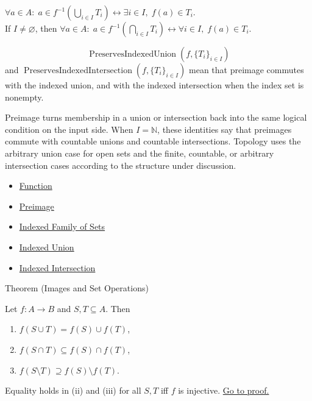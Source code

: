 \begin{remark*}
$\forall a\in A:\; a\in f^{-1}(\bigcup_{i\in I}T_i)
\leftrightarrow \exists i\in I,\; f(a)\in T_i$.\\
If $I\neq\varnothing$, then
$\forall a\in A:\; a\in f^{-1}(\bigcap_{i\in I}T_i)
\leftrightarrow \forall i\in I,\; f(a)\in T_i$.
\end{remark*}

\begin{remark*}
\[
  \operatorname{PreservesIndexedUnion}(f,\{T_i\}_{i\in I})
\] and
$\operatorname{PreservesIndexedIntersection}(f,\{T_i\}_{i\in I})$ mean
that preimage commutes with the indexed union, and with the indexed intersection
when the index set is nonempty.
\end{remark*}

\begin{remark*}[Interpretation]
Preimage turns membership in a union or intersection back into the same
logical condition on the input side. When $I=\mathbb{N}$, these identities say
that preimages commute with countable unions and countable intersections.
Topology uses the arbitrary union case for open sets and the finite, countable,
or arbitrary intersection cases according to the structure under discussion.
\end{remark*}

\begin{dependencies}
\begin{itemize}
  \item \hyperref[def:function]{Function}
  \item \hyperref[def:preimage]{Preimage}
  \item \hyperref[def:indexed-family]{Indexed Family of Sets}
  \item \hyperref[def:indexed-union]{Indexed Union}
  \item \hyperref[def:indexed-intersection]{Indexed Intersection}
\end{itemize}
\end{dependencies}

\begin{theorembox}{Theorem (Images and Set Operations)}
\begin{theorem}\label{thm:image-ops}
Let $f : A \to B$ and $S, T \subseteq A$. Then
\begin{enumerate}[label=(\roman*)]
\item $f(S \cup T) = f(S) \cup f(T)$,
\item $f(S \cap T) \subseteq f(S) \cap f(T)$,
\item $f(S \setminus T) \supseteq f(S) \setminus f(T)$.
\end{enumerate}
Equality holds in (ii) and (iii) for all $S,T$ iff $f$ is injective.
\hyperref[prf:image-ops]{Go to proof.}
\end{theorem}
\end{theorembox}

